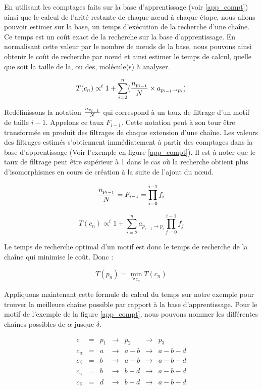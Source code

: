 En utilisant les comptages faits sur la base d'apprentissage (voir \ref{app_compt}) ainsi que le calcul de l'arité
restante de chaque n\oe{}ud à chaque étape, nous allons pouvoir estimer sur la base, un temps d'exécution de la recherche d'une
chaîne. Ce temps est un coût exact de la recherche sur la base d'apprentissage. En normalisant cette valeur par le nombre de
n\oe{}uds de la base, nous pouvons ainsi obtenir le coût de recherche par n\oe{}ud et ainsi estimer le temps de calcul, quelle que soit la taille de la, ou des, molécule(s) à analyser.

\begin{equation}
 T(c_n) \propto^t 1 + \sum_{i=2}^n ({n_{p_{i-1}} \over N} \times a_{p_{i-1} \rightarrow p_i})
\end{equation}

Redéfinissons la notation ${n_{p_{i-1}} \over N}$ qui correspond à un taux de filtrage d'un motif de taille $i-1$.
Appelons ce taux $F_{i-1}$. Cette notation peut à son tour être transformée en
produit des filtrages de chaque extension d'une chaîne. Les valeurs des filtrages estimés s'obtiennent immédiatement à partir des
comptages dans la base d'apprentissage (Voir l'exemple en figure \ref{app_compt}).
Il est à noter que le taux de filtrage peut être supérieur à 1 dans le cas où la recherche obtient plus d'isomorphismes en cours de création à la suite de l'ajout du n\oe{}ud.

\begin{equation}
 {n_{p_{i-1}} \over N} = F_{i-1} = \prod_{i=0}^{i-1} f_i
\end{equation}

\begin{equation}
 T(c_n) \propto^t 1 + \sum_{i=2}^n a_{p_{i-1} \rightarrow p_i} \prod_{j=0}^{i-1} f_j
\end{equation}

Le temps de recherche optimal d'un motif est donc le temps de recherche de la chaîne qui minimise le coût. Donc :

\begin{equation}
 T(p_n) = \min_{\forall c_n} T(c_n)
\end{equation}


Appliquons maintenant cette formule de calcul du temps sur notre exemple pour trouver la meilleure chaîne possible par
rapport à la base d'apprentissage. Pour le motif de l'exemple de la figure \ref{app_compt}, nous pouvons nommer les différentes chaînes possibles de $\alpha$
jusque $\delta$.

\[
\begin{array}{ccccccc}
 c         & = & p_1 & \rightarrow & p_2     & \rightarrow & p_3 \\
 c_\alpha  & = & a   & \rightarrow & a\!-\!b & \rightarrow & a\!-\!b\!-\!d \\
 c_\beta   & = & b   & \rightarrow & a\!-\!b & \rightarrow & a\!-\!b\!-\!d \\
 c_\gamma  & = & b   & \rightarrow & b\!-\!d & \rightarrow & a\!-\!b\!-\!d \\
 c_\delta  & = & d   & \rightarrow & b\!-\!d & \rightarrow & a\!-\!b\!-\!d \\
\end{array}
\]

